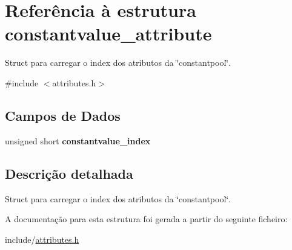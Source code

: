 \hypertarget{structconstantvalue__attribute}{}\section{Referência à estrutura constantvalue\+\_\+attribute}
\label{structconstantvalue__attribute}


Struct para carregar o index dos atributos da \char`\"{}constantpool\char`\"{}.  




{\ttfamily \#include $<$attributes.\+h$>$}

\subsection*{Campos de Dados}
\begin{DoxyCompactItemize}
\item 
\mbox{\label{structconstantvalue__attribute_ad58e1db4120139c8be419ec651ab3fc9}} 
unsigned short {\bfseries constantvalue\+\_\+index}
\end{DoxyCompactItemize}


\subsection{Descrição detalhada}
Struct para carregar o index dos atributos da \char`\"{}constantpool\char`\"{}. 

A documentação para esta estrutura foi gerada a partir do seguinte ficheiro\+:\begin{DoxyCompactItemize}
\item 
include/\hyperlink{attributes_8h}{attributes.\+h}\end{DoxyCompactItemize}
